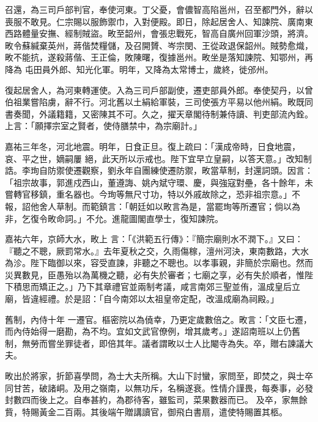\begin{pinyinscope}
 召還，為三司戶部判官，奉使河東。丁父憂，會儂智高陷邕州，召至都門外，辭以喪服不敢見。仁宗賜以服飾禦巾，入對便殿。即日，除起居舍人、知諫院、廣南東西路體量安撫、經制賊盜。畋至韶州，會張忠戰死，智高自廣州回軍沙頭，將濟。畋令蘇緘棄英州，蔣偕焚糧儲，及召開贇、岑宗閔、王從政退保韶州。賊勢愈熾，畋不能抗，遂殺蔣偕、王正倫，敗陳曙，復據邕州。畋坐是落知諫院、知鄂州，再降為
 屯田員外郎、知光化軍。明年，又降為太常博士，歲終，徙邠州。



 復起居舍人，為河東轉運使。入為三司戶部副使，遷吏部員外郎。奉使契丹，以曾伯祖業嘗陷虜，辭不行。河北舊以土絹給軍裝，三司使張方平易以他州絹。畋既同書奏聞，外議籍籍，又密陳其不可。久之，擢天章閣待制兼侍讀、判吏部流內銓。上言：「願擇宗室之賢者，使侍膳禁中，為宗廟計。」



 嘉祐三年冬，河北地震。明年，日食正旦。復上疏曰：「漢成帝時，日食地震，哀、平之世，嫡嗣屢
 絕，此天所以示戒也。陛下宜早立皇嗣，以答天意。」改知制誥。李珣自防禦使遷觀察，劉永年自團練使遷防禦，畋當草制，封還詞頭。因言：「祖宗故事，郭進戍西山，董遵誨、姚內斌守環、慶，與強寇對壘，各十餘年，未嘗轉官移鎮，重名器也。今珣等無尺寸功，特以外戚故除之，恐非祖宗意。」不報，詔他舍人草制。而範鎮言：「朝廷如以畋言為是，當罷珣等所遷官；倘以為非，乞復令畋命詞。」不允。進龍圖閣直學士，復知諫院。



 嘉祐六年，京師大水，畋上
 言：「《洪範五行傳》：『簡宗廟則水不潤下。』又曰：『聽之不聰，厥罰常水。』去年夏秋之交，久雨傷稼，澶州河決，東南數路，大水為沴。陛下臨御以來，容受直諫，非聽之不聰也。以孝事親，非簡於宗廟也。然而災異數見，臣愚殆以為萬機之聽，必有失於審者；七廟之享，必有失於順者，惟陛下積思而矯正之。」乃下其章禮官並兩制考議，咸言南郊三聖並侑，溫成皇后立廟，皆違經禮。於是詔：「自今南郊以太祖皇帝定配，改溫成廟為祠殿。」



 舊制，內侍十年
 一遷官。樞密院以為僥幸，乃更定歲數倍之。畋言：「文臣七遷，而內侍始得一磨勘，為不均。宜如文武官僚例，增其歲考。」遂詔南班以上仍舊制，無勞而嘗坐罪徒者，即倍其年。議者謂畋以士人比閹寺為失。卒，贈右諫議大夫。



 畋出於將家，折節喜學問，為士大夫所稱。大山下討蠻，家問至，即焚之，與士卒同甘苦，破諸峒。及用之嶺南，以無功斥，名稱遂衰。性情介謹畏，每奏事，必發封數四而後上之。自奉甚約，為郡待客，雖監司，菜果數器而已。
 及卒，家無餘貲，特賜黃金二百兩。其後端午贈講讀官，御飛白書扇，遣使特賜置其柩。




\end{pinyinscope}
